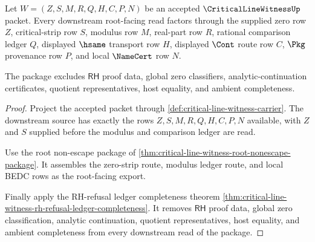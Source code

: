 \begin{theorem}
\label{thm:critical-line-witness-root-downstream-package}
Let $W=(Z,S,M,R,Q,H,C,P,N)$ be an accepted $\CriticalLineWitnessUp$ packet. Every downstream root-facing read factors through the supplied zero row $Z$, critical-strip row $S$, modulus row $M$, real-part row $R$, rational comparison ledger $Q$, displayed $\hsame$ transport row $H$, displayed $\Cont$ route row $C$, $\Pkg$ provenance row $P$, and local $\NameCert$ row $N$.

The package excludes $\mathsf{RH}$ proof data, global zero classifiers, analytic-continuation certificates, quotient representatives, host equality, and ambient completeness.
\end{theorem}
\begin{proof}
Project the accepted packet through \autoref{def:critical-line-witness-carrier}. The downstream source has exactly the rows $Z,S,M,R,Q,H,C,P,N$ available, with $Z$ and $S$ supplied before the modulus and comparison ledger are read.

Use the root non-escape package of \autoref{thm:critical-line-witness-root-nonescape-package}. It assembles the zero-strip route, modulus ledger route, and local BEDC rows as the root-facing export.

Finally apply the RH-refusal ledger completeness theorem \autoref{thm:critical-line-witness-rh-refusal-ledger-completeness}. It removes $\mathsf{RH}$ proof data, global zero classification, analytic continuation, quotient representatives, host equality, and ambient completeness from every downstream read of the package.
\end{proof}

